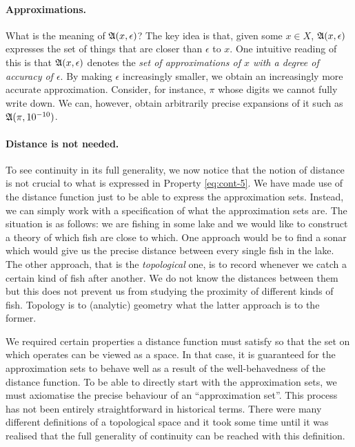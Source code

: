 \paragraph*{Approximations.}
What is the meaning of $\mathfrak{A}(x, \epsilon)$? The key idea is that, given some $x \in X$,
$\mathfrak{A}(x, \epsilon)$ expresses the set of things that are closer than $\epsilon$ to $x$. One intuitive
reading of this is that $\mathfrak{A}(x, \epsilon)$ denotes the \emph{set of approximations of $x$ with
a degree of accuracy of $\epsilon$}. By making $\epsilon$ increasingly smaller, we obtain an
increasingly more accurate approximation. Consider, for instance, $\pi$ whose digits we
cannot fully write down. We can, however, obtain arbitrarily precise expansions of it such
as $\mathfrak{A}(\pi, 10^{-10})$.

\paragraph*{Distance is not needed.}
To see continuity in its full generality, we now notice that the notion of distance is not
crucial to what is expressed in Property \ref{eq:cont-5}. We have made use of the distance
function just to be able to express the approximation sets. Instead, we can simply work
with a specification of what the approximation sets are. The situation is as follows: we
are fishing in some lake and we would like to construct a theory of which fish are close
to which. One approach would be to find a sonar which would give us the precise distance
between every single fish in the lake. The other approach, that is the \emph{topological}
one, is to record whenever we catch a certain kind of fish after another. We do not know
the distances between them but this does not prevent us from studying the proximity of
different kinds of fish. Topology is to (analytic) geometry what the latter approach is to
the former.

We required certain properties a distance function must satisfy so that the set on which
operates can be viewed as a space. In that case, it is guaranteed for the approximation
sets to behave well as a result of the well-behavedness of the distance function. To be
able to directly start with the approximation sets, we must axiomatise the precise
behaviour of an ``approximation set''. This process has not been entirely straightforward
in historical terms. There were many different definitions of a topological space and it
took some time until it was realised that the full generality of continuity can be reached
with this definition.


